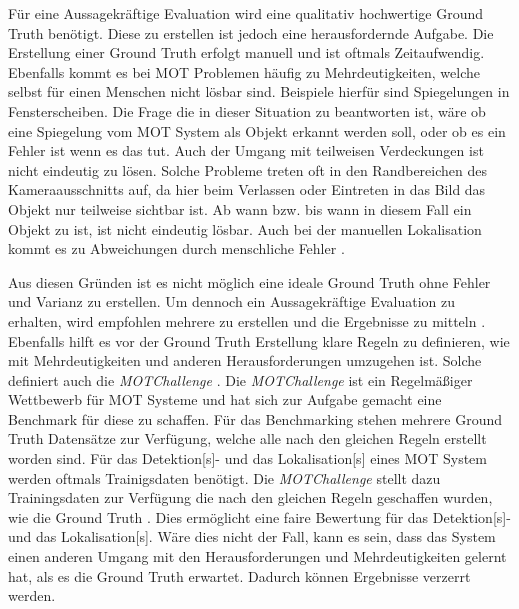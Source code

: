 Für eine Aussagekräftige Evaluation wird eine qualitativ hochwertige \gls{Ground Truth} benötigt. Diese zu erstellen ist jedoch eine herausfordernde Aufgabe. Die Erstellung einer \gls{Ground Truth} erfolgt manuell und ist oftmals Zeitaufwendig. Ebenfalls kommt es bei \gls{MOT} Problemen häufig zu Mehrdeutigkeiten, welche selbst für einen Menschen nicht lösbar sind. Beispiele hierfür sind Spiegelungen in Fensterscheiben. Die Frage die in dieser Situation zu beantworten ist, wäre ob eine Spiegelung vom \gls{MOT} System als Objekt erkannt werden soll, oder ob es ein Fehler ist wenn es das tut. Auch der Umgang mit teilweisen Verdeckungen ist nicht eindeutig zu lösen. Solche Probleme treten oft in den Randbereichen des Kameraausschnitts auf, da hier beim Verlassen oder Eintreten in das Bild das Objekt nur teilweise sichtbar ist. Ab wann bzw. bis wann in diesem Fall ein Objekt zu  ist, ist nicht eindeutig lösbar. Auch bei der manuellen \gls{Lokalisation} kommt es zu Abweichungen durch menschliche Fehler \cite{MOT15, Milan.2013}.  \par


Aus diesen Gründen ist es nicht möglich eine ideale \gls{Ground Truth} ohne Fehler und Varianz zu erstellen. Um dennoch ein Aussagekräftige Evaluation zu erhalten, wird empfohlen mehrere  zu erstellen und die Ergebnisse zu mitteln \cite{Milan.2013}. Ebenfalls hilft es vor der \gls{Ground Truth} Erstellung klare Regeln zu definieren, wie mit Mehrdeutigkeiten und anderen Herausforderungen umzugehen ist. Solche definiert auch die \textit{MOTChallenge} \cite{MOT16, MOT20}. Die \textit{MOTChallenge} ist ein Regelmäßiger Wettbewerb für \gls{MOT} Systeme und hat sich zur Aufgabe gemacht eine Benchmark für diese zu schaffen. Für das Benchmarking stehen mehrere \gls{Ground Truth} Datensätze zur Verfügung, welche alle nach den gleichen Regeln erstellt worden sind. Für das \gls{Detektion}[s]- und das \gls{Lokalisation}[s] eines \gls{MOT} System werden oftmals Trainigsdaten benötigt. Die \textit{MOTChallenge} stellt dazu Trainingsdaten zur Verfügung die nach den gleichen Regeln geschaffen wurden, wie die \gls{Ground Truth} \cite{MOT16, MOT20}. Dies ermöglicht eine faire Bewertung für das \gls{Detektion}[s]- und das \gls{Lokalisation}[s]. Wäre dies nicht der Fall, kann es sein, dass das System einen anderen Umgang mit den Herausforderungen und Mehrdeutigkeiten gelernt hat, als es die \gls{Ground Truth} erwartet. Dadurch können Ergebnisse verzerrt werden. \par

